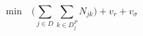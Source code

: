 \documentclass[../../thesis.tex]{subfiles}
\begin{document}
\begin{equation}
  \text{min} \quad \big( \sum_{j \in D} \sum_{k \in D^P_j} N_{jk} \big) + v_r + v_{\sigma}
\end{equation}







\end{document}
